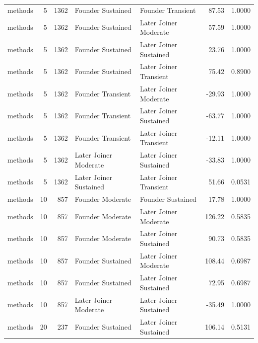 \begin{table}[H]
{\begin{tabular}{l r r l l r r}
methods & 5 & 1362 & Founder Sustained & Founder Transient & 87.53 & 1.0000 \\ 
methods & 5 & 1362 & Founder Sustained & Later Joiner Moderate & 57.59 & 1.0000 \\ 
methods & 5 & 1362 & Founder Sustained & Later Joiner Sustained & 23.76 & 1.0000 \\ 
methods & 5 & 1362 & Founder Sustained & Later Joiner Transient & 75.42 & 0.8900 \\ 
methods & 5 & 1362 & Founder Transient & Later Joiner Moderate & -29.93 & 1.0000 \\ 
methods & 5 & 1362 & Founder Transient & Later Joiner Sustained & -63.77 & 1.0000 \\ 
methods & 5 & 1362 & Founder Transient & Later Joiner Transient & -12.11 & 1.0000 \\ 
methods & 5 & 1362 & Later Joiner Moderate & Later Joiner Sustained & -33.83 & 1.0000 \\ 
methods & 5 & 1362 & Later Joiner Sustained & Later Joiner Transient & 51.66 & 0.0531 \\ 
methods & 10 & 857 & Founder Moderate & Founder Sustained & 17.78 & 1.0000 \\ 
methods & 10 & 857 & Founder Moderate & Later Joiner Moderate & 126.22 & 0.5835 \\ 
methods & 10 & 857 & Founder Moderate & Later Joiner Sustained & 90.73 & 0.5835 \\ 
methods & 10 & 857 & Founder Sustained & Later Joiner Moderate & 108.44 & 0.6987 \\ 
methods & 10 & 857 & Founder Sustained & Later Joiner Sustained & 72.95 & 0.6987 \\ 
methods & 10 & 857 & Later Joiner Moderate & Later Joiner Sustained & -35.49 & 1.0000 \\ 
methods & 20 & 237 & Founder Sustained & Later Joiner Sustained & 106.14 & 0.5131 \\ 
\bottomrule
\end{tabular}%
} 
\end{table}
\newpage 
